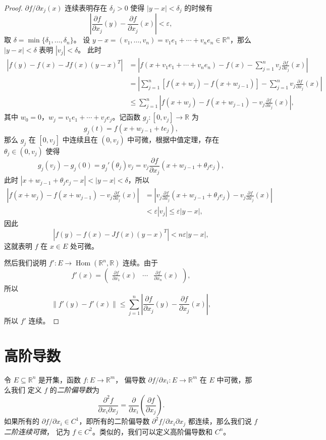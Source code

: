 \documentclass[fontset=none,zihao=-4]{Notes}
\DeclareMathOperator\Hom{Hom}
\newcommand{\norm}[1]{\left\lVert#1\right\rVert}
\newcommand{\abs}[1]{\left\lvert#1\right\rvert}
\begin{document}
\begin{proof}
  $\partial f/\partial x_j(x)$ 连续表明存在 $\delta_j>0$ 使得
  $\abs{y-x}<\delta_j$ 的时候有
  \[
    \abs{\frac{\partial f}{\partial x_j}(y)-\frac{\partial f}{\partial x_j}(x)}<\varepsilon,  
  \]
  取 $\delta=\min\{\delta_1,\dots,\delta_n\}$。
  设 $y-x=(v_1,\dots,v_n)=v_1e_1+\cdots+v_ne_n\in\mathbb{R}^n$，那么 $\abs{y-x}<\delta$ 表明 $|v_j|<\delta$。
  此时
  \begin{align*}
    \abs{f(y)-f(x)-Jf(x)(y-x)^T}&=\abs{f(x+v_1e_1+\cdots+v_ne_n)-f(x)-\sum_{j=1}^nv_j\frac{\partial f}{\partial x_j}(x)}\\
    &=\abs{\sum_{j=1}^n [f(x+w_j)-f(x+w_{j-1})]-\sum_{j=1}^nv_j\frac{\partial f}{\partial x_j}(x)}\\
    &\leq \sum_{j=1}^n\abs{f(x+w_j)-f(x+w_{j-1})-v_j\frac{\partial f}{\partial x_j }(x)},
  \end{align*}
  其中 $w_0=0$，$w_j=v_1e_1+\cdots+v_je_j$。记函数 $g_j:[0,v_j]\to\mathbb{R}$ 为
  \[
    g_j(t)=f(x+w_{j-1}+te_j),  
  \]
  那么 $g_j$ 在 $[0,v_j]$ 中连续且在 $(0,v_j)$ 中可微，根据中值定理，存在 $\theta_j\in (0,v_j)$
  使得
  \[
    g_j(v_j)-g_j(0)=g_j'(\theta_j)v_j=v_j\frac{\partial f}{\partial x_j}(x+w_{j-1}+\theta_je_j),
  \]
  此时 $\abs{x+w_{j-1}+\theta_je_j-x}<\abs{y-x}<\delta$，所以
  \begin{align*}
    \abs{f(x+w_j)-f(x+w_{j-1})-v_j\frac{\partial f}{\partial x_j }(x)}&=
    \abs{v_j\frac{\partial f}{\partial x_j}(x+w_{j-1}+\theta_je_j)-v_j\frac{\partial f}{\partial x_j }(x)}\\
    &<\varepsilon\abs{v_j}\leq \varepsilon\abs{y-x},
  \end{align*}
  因此
  \[
    \abs{f(y)-f(x)-Jf(x)(y-x)^T}<n\varepsilon\abs{y-x},
  \]
  这就表明 $f$ 在 $x\in E$ 处可微。

  然后我们说明 $f':E\to \Hom(\mathbb{R}^n,\mathbb{R})$ 连续。由于
  \[
    f'(x)=\begin{pmatrix}
      \frac{\partial f}{\partial x_1}(x) & \cdots & \frac{\partial f}{\partial x_n}(x)
    \end{pmatrix},
  \]
  所以
  \[
    \norm{f'(y)-f'(x)}\leq \sum_{j=1}^n\abs{\frac{\partial f}{\partial x_j}(y)-\frac{\partial f}{\partial x_j}(x)},
  \]
  所以 $f'$ 连续。
\end{proof}

\section{高阶导数}

令 $E\subseteq\mathbb{R}^n$ 是开集，函数 $f:E\to\mathbb{R}^m$，
偏导数 $\partial f/\partial x_i:E\to\mathbb{R}^m$ 在 $E$ 中可微，那么我们
定义 $f$ 的\emph{二阶偏导数}为
\[
  \frac{\partial^2 f}{\partial x_i\partial x_j}=\frac{\partial}{\partial x_i}
  \left(\frac{\partial f}{\partial x_j}\right).
\]
如果所有的 $\partial f/\partial x_i\in C^1$，即所有的二阶偏导数
$\partial^2 f/\partial x_i\partial x_j$ 都连续，那么我们说 $f$ \emph{二阶连续可微}，
记为 $f\in C^2$。类似的，我们可以定义高阶偏导数和 $C^n$。
\end{document}
